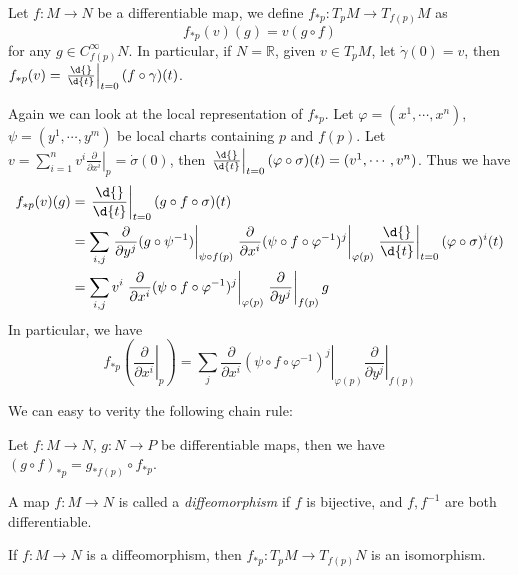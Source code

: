\begin{defn}
    Let $f:M\to N$ be a differentiable map, we define $f_{*p}:T_pM\to T_{f(p)}M$ as
    \[f_{*p}(v)(g)=v(g\circ f)\]
    for any $g\in C^\infty_{f(p)}N$.
    In particular, if $N=\mathbb{R}$, given $v\in T_pM$, let $\dot{\gamma}(0)=v$, then $f_{*p}(v)=\left.\frac{\d{}}{\d{t}}\right|_{t=0}(f\circ\gamma)(t)$.
\end{defn}

Again we can look at the local representation of $f_{*p}$.
Let $\varphi=(x^1,\cdots,x^n)$, $\psi=(y^1,\cdots,y^m)$ be local charts containing $p$ and $f(p)$.
Let $v=\sum_{i=1}^nv^i\left.\frac{\partial{}}{\partial{x^i}}\right|_p=\dot{\sigma}(0)$, then $\left.\frac{\d{}}{\d{t}}\right|_{t=0}(\varphi\circ\sigma)(t)=(v^1,\cdots,v^n)$.
Thus we have
\begin{align*}
    f_{*p}(v)(g)&=\left.\frac{\d{}}{\d{t}}\right|_{t=0}(g\circ f\circ\sigma)(t)\\
    &=\sum_{i,j}\left.\frac{\partial{}}{\partial{y^j}}(g\circ\psi^{-1})\right|_{\psi\circ f(p)}\left.\frac{\partial{}}{\partial{x^i}}(\psi\circ f\circ\varphi^{-1})^j\right|_{\varphi(p)}\left.\frac{\d{}}{\d{t}}\right|_{t=0}(\varphi\circ\sigma)^i(t)\\
    &=\sum_{i,j}v^i\left.\frac{\partial{}}{\partial{x^i}}(\psi\circ f\circ\varphi^{-1})^j\right|_{\varphi(p)}\left.\frac{\partial{}}{\partial{y^j}}\right|_{f(p)}g
\end{align*}
In particular, we have
\[f_{*p}\left(\left.\frac{\partial{}}{\partial{x^i}}\right|_p\right)=\sum_j\left.\frac{\partial{}}{\partial{x^i}}(\psi\circ f\circ\varphi^{-1})^j\right|_{\varphi(p)}\left.\frac{\partial{}}{\partial{y^j}}\right|_{f(p)}\]

We can easy to verity the following chain rule:
\begin{prop}
    Let $f:M\to N$, $g:N\to P$ be differentiable maps, then we have $(g\circ f)_{*p}=g_{*f(p)}\circ f_{*p}$.
\end{prop}

\begin{defn}[Diffeomorphism]
    A map $f:M\to N$ is called a \emph{diffeomorphism} if $f$ is bijective, and $f,f^{-1}$ are both differentiable.
\end{defn}

\begin{prop}\label{diffeo to iso}
    If $f:M\to N$ is a diffeomorphism, then $f_{*p}:T_pM\to T_{f(p)}N$ is an isomorphism.
\end{prop}

